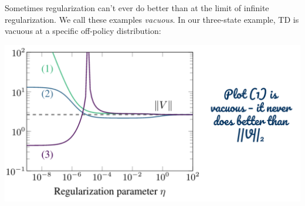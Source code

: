 Sometimes regularization can't ever do better than at the limit of infinite regularization. We call these examples \emph{vacuous}. In our three-state example, TD is vacuous at a specific off-policy distribution:
\vspace{-.1in}
\begin{center}
    \hspace*{1in}
    \includegraphics[scale=0.4]{parts/vacuous/vacuousactual.png}
\end{center}
\vspace{-.6in}
